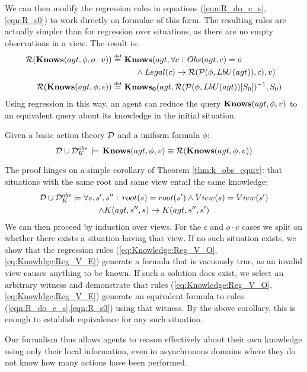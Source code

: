 We can then modify the regression rules in equations (\ref{eqn:R_do_c_s},\ref{eqn:R_s0})
to work directly on formulae of this form. The resulting rules are
actually simpler than for regression over situations, as there are
no empty observations in a view. The result is:\begin{align}
\mathcal{R}(\mathbf{Knows}(agt,\phi,o\cdot v))\stackrel{\mbox{\tiny def}}{=}\,\, & \mathbf{Knows}(agt,\forall c:\, Obs(agt,c)=o\nonumber \\
 & \,\,\,\,\,\,\,\,\wedge Legal(c)\rightarrow\mathcal{R}(\mathcal{P}(\phi,LbU(agt)),c),v)\label{eq:Knowledge:Reg_V_O}\\
\mathcal{R}(\mathbf{Knows}(agt,\phi,\epsilon))\stackrel{\mbox{\tiny def}}{=}\,\, & \mathbf{Knows_{0}}(agt,\mathcal{R}(\mathcal{P}(\phi,LbU(agt))[S_{0}])^{-1},S_{0})\label{eq:Knowldge:Reg_V_E}\end{align}
 Using regression in this way, an agent can reduce the query $\mathbf{Knows}(agt,\phi,v)$
to an equivalent query about its knowledge in the initial situation. 
\begin{thm}
\label{thm:Reg_KnowsO}Given a basic action theory $\mathcal{D}$ and a uniform
formula $\phi$:\[
\mathcal{D}\cup\mathcal{D}_{K}^{obs}\,\models\,\mathbf{Knows}(agt,\phi,v)\equiv\mathcal{R}(\mathbf{Knows}(agt,\phi,v))\]
 \end{thm}
\begin{proofsketch}
The proof hinges on a simple corollary of Theorem \ref{thm:k_obs_equiv}:
that situations with the same root and same view entail the same knowledge:\begin{multline*}
\mathcal{D}\cup\mathcal{D}_{K}^{obs}\models\forall s,s',s'':\, root(s)=root(s')\wedge View(s)=View(s')\\
\wedge K(agt,s'',s)\rightarrow K(agt,s'',s')\end{multline*}
 We can then proceed by induction over views. For the $\epsilon$
and $o\cdot v$ cases we split on whether there exists a situation
having that view. If no such situation exists, we show that the regression
rules (\ref{eq:Knowledge:Reg_V_O}, \ref{eq:Knowldge:Reg_V_E}) generate
a formula that is vacuously true, as an invalid view causes anything
to be known. If such a solution does exist, we select an arbitrary
witness and demonstrate that rules (\ref{eq:Knowledge:Reg_V_O}, \ref{eq:Knowldge:Reg_V_E})
generate an equivalent formula to rules (\ref{eqn:R_do_c_s},\ref{eqn:R_s0})
using that witness. By the above corollary, this is enough to establish
equivalence for any such situation. 
\end{proofsketch}
Our formalism thus allows agents to reason effectively about their
own knowledge using only their local information, even in asynchronous
domains where they do not know how many actions have been performed.

